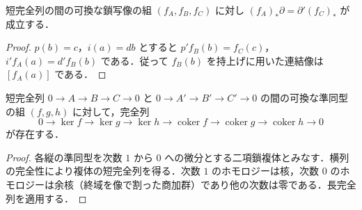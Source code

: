 \begin{prop}[連結準同型の自然性]
短完全列の間の可換な鎖写像の組 $(f_A,f_B,f_C)$ に対し $(f_A)_*\partial=\partial'(f_C)_*$ が成立する．
\end{prop}
\begin{proof}
$p(b)=c$，$i(a)=db$ とすると $p'f_B(b)=f_C(c)$，$i'f_A(a)=d'f_B(b)$ である．従って $f_B(b)$ を持上げに用いた連結像は $[f_A(a)]$ である．
\end{proof}
\begin{prop}[蛇の補題]
短完全列 $0\to A\to B\to C\to0$ と $0\to A'\to B'\to C'\to0$ の間の可換な準同型の組 $(f,g,h)$ に対して，完全列
\[
0\to\ker f\to\ker g\to\ker h\to
\operatorname{coker}f\to\operatorname{coker}g\to\operatorname{coker}h\to0
\]
が存在する．
\end{prop}
\begin{proof}
各縦の準同型を次数 $1$ から $0$ への微分とする二項鎖複体とみなす．横列の完全性により複体の短完全列を得る．次数 $1$ のホモロジーは核，次数 $0$ のホモロジーは余核（終域を像で割った商加群）であり他の次数は零である．長完全列を適用する．
\end{proof}
